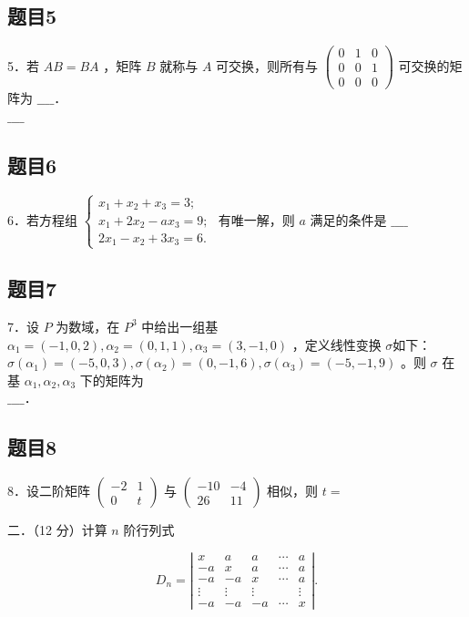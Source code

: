 \documentclass{article}
\begin{document}
\subsection{题目5}
5．若 \(A B=B A\) ，矩阵 \(B\) 就称与 \(A\) 可交换，则所有与 \(\left(\begin{array}{lll}0 & 1 & 0 \\ 0 & 0 & 1 \\ 0 & 0 & 0\end{array}\right)\) 可交换的矩阵为 \(\_\_\_\_\)．\\
\(\_\_\_\_\)

\subsection{题目6}
6．若方程组 \(\left\{\begin{array}{l}x_{1}+x_{2}+x_{3}=3 ; \\ x_{1}+2 x_{2}-a x_{3}=9 ; \\ 2 x_{1}-x_{2}+3 x_{3}=6 .\end{array}\right.\) 有唯一解，则 \(a\) 满足的条件是 \(\_\_\_\_\)

\subsection{题目7}
7．设 \(P\) 为数域，在 \(P^{3}\) 中给出一组基 \(\alpha_{1}=(-1,0,2), \alpha_{2}=(0,1,1), \alpha_{3}=(3,-1,0)\) ，定义线性变换 \(\sigma\)如下：\(\sigma\left(\alpha_{1}\right)=(-5,0,3), \sigma\left(\alpha_{2}\right)=(0,-1,6), \sigma\left(\alpha_{3}\right)=(-5,-1,9)\) 。则 \(\sigma\) 在基 \(\alpha_{1}, \alpha_{2}, \alpha_{3}\) 下的矩阵为\\
\(\_\_\_\_\)．

\subsection{题目8}
8．设二阶矩阵 \(\left(\begin{array}{cc}-2 & 1 \\ 0 & t\end{array}\right)\) 与 \(\left(\begin{array}{cc}-10 & -4 \\ 26 & 11\end{array}\right)\) 相似，则 \(t=\)

二．（12 分）计算 \(n\) 阶行列式

\[
D_{n}=\left|\begin{array}{ccccc}
x & a & a & \cdots & a \\
-a & x & a & \cdots & a \\
-a & -a & x & \cdots & a \\
\vdots & \vdots & \vdots & & \vdots \\
-a & -a & -a & \cdots & x
\end{array}\right| .
\]
\end{document}
